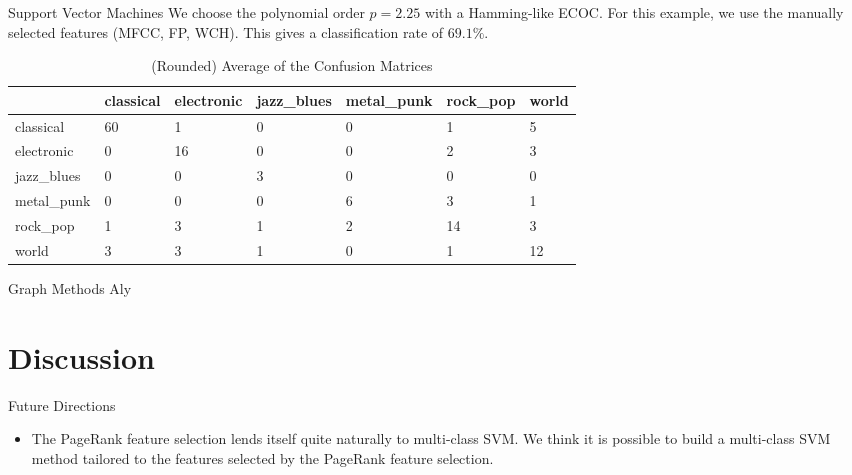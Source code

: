 \documentclass[xcolor=dvipsnames,t]{beamer} %
\begin{document}
\begin{frame}[shrink=20]{Support Vector Machines}
   We choose the polynomial order $p=2.25$ with a Hamming-like ECOC.  For this example, we use the manually selected features (MFCC, FP, WCH).  This gives a classification rate of $69.1\%$.

   \begin{table}[h!]
      \centering
         \begin{tabular}{ l||l | l | l | l | l | l | }
         & classical & electronic & jazz\_blues & metal\_punk & rock\_pop & world\\\hline
         classical & 60 &1 &0 &0 &1 &5 \\ \hline 
         electronic & 0 &16 &0 &0 &2 &3 \\ \hline 
         jazz\_blues & 0 &0 &3 &0 &0 &0 \\ \hline 
         metal\_punk & 0 &0 &0 &6 &3 &1 \\ \hline 
         rock\_pop & 1 &3 &1 &2 &14 &3 \\ \hline 
         world & 3 &3 &1 &0 &1 &12 \\ \hline 
         \end{tabular}
      \caption{(Rounded) Average of the Confusion Matrices}
   \end{table}
\end{frame}




\begin{frame}{Graph Methods}
Aly
\end{frame}


\section{Discussion}
\begin{frame}{Future Directions}
   \begin{itemize}
      \item The PageRank feature selection lends itself quite naturally to multi-class SVM.  We think it is possible to build a multi-class SVM method tailored to the features selected by the PageRank feature selection.
   \end{itemize}

\end{frame}
\end{document}
